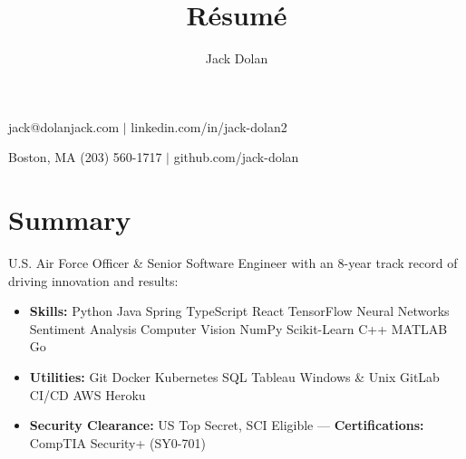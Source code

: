 \documentclass{article}
\makeatletter
\renewcommand{\maketitle}{ 
{\huge\bfseries\theauthor}\hfill jack@dolanjack.com $|$ linkedin.com/in/jack-dolan2

\vspace{0.2em} 

Boston, MA \hfill (203) 560-1717 $|$ github.com/jack-dolan
}
\makeatother
\begin{document}
 
\title{R\'esum\'e} 
\author{Jack Dolan} 
\maketitle
{}


\section{Summary} 
U.S. Air Force Officer \& Senior Software Engineer with an 8-year track record of driving innovation and results:
    \begin{itemize}
    \itemsep0em
    \item \textbf{Skills:} Python \text{\textbar} Java \text{\textbar} Spring \text{\textbar} TypeScript \text{\textbar} React \text{\textbar} TensorFlow \text{\textbar} Neural Networks \text{\textbar} Sentiment Analysis \text{\textbar} Computer Vision \text{\textbar} NumPy \text{\textbar} Scikit-Learn \text{\textbar} C++ \text{\textbar} MATLAB \text{\textbar} Go
    \item \textbf{Utilities:} Git \text{\textbar} Docker \text{\textbar} Kubernetes \text{\textbar} SQL \text{\textbar} Tableau \text{\textbar} Windows \& Unix \text{\textbar} GitLab CI/CD \text{\textbar} AWS \text{\textbar} Heroku
    \item \textbf{Security Clearance:} US Top Secret, SCI Eligible --- \textbf{Certifications:} CompTIA Security+ (SY0-701) \end{itemize}  

\end{document}
